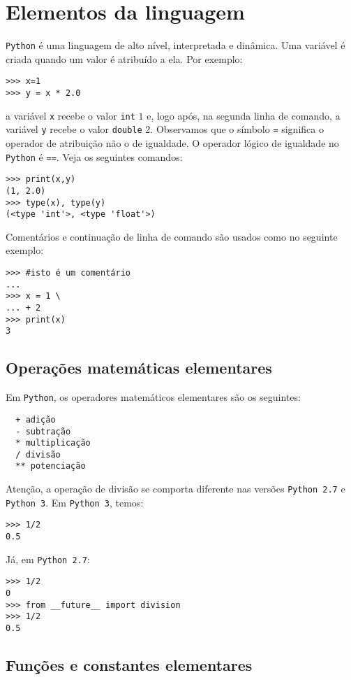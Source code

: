 \section{Elementos da linguagem}

\verb+Python+ é uma linguagem de alto nível, interpretada e dinâmica. Uma variável é criada quando um valor é atribuído a ela. Por exemplo:
\begin{verbatim}
>>> x=1
>>> y = x * 2.0
\end{verbatim}
a variável \verb+x+ recebe o valor \verb+int+ $1$ e, logo após, na segunda linha de comando, a variável \verb+y+ recebe o valor \verb+double+ $2$. Observamos que o símbolo \verb+=+ significa o operador de atribuição não o de igualdade. O operador lógico de igualdade no \verb+Python+ é \verb+==+. Veja os seguintes comandos:
\begin{verbatim}
>>> print(x,y)
(1, 2.0)
>>> type(x), type(y)
(<type 'int'>, <type 'float'>)
\end{verbatim}

Comentários e continuação de linha de comando são usados como no seguinte exemplo:
\begin{verbatim}
>>> #isto é um comentário
... 
>>> x = 1 \
... + 2
>>> print(x)
3
\end{verbatim}

\subsection{Operações matemáticas elementares}

Em \verb+Python+, os operadores matemáticos elementares são os seguintes:
\begin{verbatim}
  + adição
  - subtração
  * multiplicação
  / divisão
  ** potenciação
\end{verbatim}

Atenção, a operação de divisão se comporta diferente nas versões \verb+Python 2.7+ e \verb+Python 3+. Em \verb+Python 3+, temos:
\begin{verbatim}
>>> 1/2
0.5
\end{verbatim}
Já, em \verb+Python 2.7+:
\begin{verbatim}
>>> 1/2
0
>>> from __future__ import division
>>> 1/2
0.5
\end{verbatim}

\subsection{Funções e constantes elementares}

